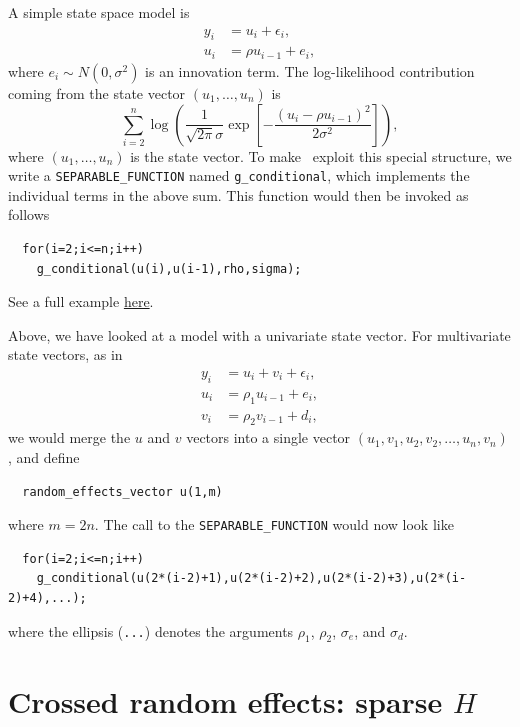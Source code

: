 \documentclass{admbmanual}
\begin{document}
A simple state space model is
\begin{align*}
  y_i &= u_i + \epsilon_i,\\
  u_i &= \rho u_{i-1} + e_i,
\end{align*}
where $e_i\sim N(0,\sigma^2)$ is an innovation term. The log-likelihood
contribution coming from the state vector $(u_1,\ldots,u_n)$ is
\[
\sum_{i=2}^n \log\left(\frac{1}{\sqrt{2\pi}\sigma}
  \exp\left[-\frac{(u_i-\rho u_{i-1})^2}{2\sigma^2}\right]\right),
\]
where $(u_1,\ldots,u_n)$ is the state vector. To make \scAR\ exploit this
special structure, we write a \texttt{SEPARABLE\_FUNCTION} named
\texttt{g\_conditional}, which implements the individual terms in the above sum.
This function would then be invoked as follows
\begin{lstlisting}
  for(i=2;i<=n;i++)
    g_conditional(u(i),u(i-1),rho,sigma);
\end{lstlisting}
See a full example
\href{http://www.admb-project.org/otter-research/admbre/examples/polio/polio.html}{here}.

Above, we have looked at a model with a univariate state vector. For
multivariate state vectors, as in
\begin{align*}
  y_i &= u_i + v_i +\epsilon_i,\\
  u_i &= \rho_1 u_{i-1} + e_i,\\
  v_i &= \rho_2 v_{i-1} + d_i,
\end{align*}
we would merge the $u$ and $v$ vectors into a single vector
$(u_1,v_1,u_2,v_2,\ldots,u_n,v_n)$, and define
\begin{lstlisting}
  random_effects_vector u(1,m)
\end{lstlisting}
where $m=2n$. The call to the \texttt{SEPARABLE\_FUNCTION} would now look like
\begin{lstlisting}
  for(i=2;i<=n;i++)
    g_conditional(u(2*(i-2)+1),u(2*(i-2)+2),u(2*(i-2)+3),u(2*(i-2)+4),...);
\end{lstlisting}
where the ellipsis (\texttt{...}) denotes the arguments $\rho_1$, $\rho_2$,
$\sigma_e$, and $\sigma_d$.

\section{Crossed random effects: sparse $H$}
\end{document}
